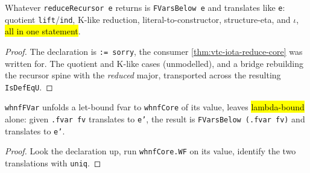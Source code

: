 \begin{theorem}
  \label{thm:vtc-reducerecursor}
  \leanok

   Whatever \texttt{reduceRecursor e} returns is \texttt{FVarsBelow e} and
  translates like \texttt{e}: quotient \texttt{lift}/\texttt{ind}, K-like reduction,
  literal-to-constructor, structure-eta, and $\iota$, \hl{all in one statement}.
\end{theorem}
\begin{proof}
  \stSorry{} The declaration is \texttt{:= sorry}, the consumer
  \ref{thm:vtc-iota-reduce-core} was written for.
   The quotient and K-like cases (unmodelled), and a bridge rebuilding the
  recursor spine with the \emph{reduced} major, transported across the resulting
  \texttt{IsDefEqU}.
\end{proof}

\begin{lemma}
  \label{thm:vtc-whnffvar}
  \leanok

   \texttt{whnfFVar} unfolds a let-bound fvar to \texttt{whnfCore} of its value,
  leaves \hl{lambda-bound} alone: given \texttt{.fvar fv} translates to \texttt{e'}, the result
  is \texttt{FVarsBelow (.fvar fv)} and translates to \texttt{e'}.
\end{lemma}
\begin{proof}
  \leanok
   Look the declaration up, run \texttt{whnfCore.WF} on its value, identify the two
  translations with \texttt{uniq}.
\end{proof}

